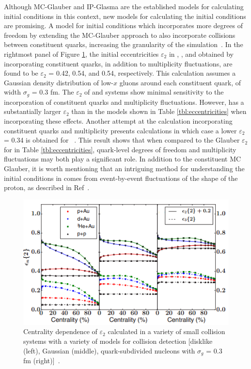 Although MC-Glauber and IP-Glasma are the established models for calculating initial conditions in this context, new models for calculating the initial conditions are promising. A model for initial conditions which incorporates more degrees of freedom by extending the MC-Glauber approach to also incorporate collisions between constituent quarks, increasing the granularity of the simulation~\cite{PhysRevC.67.064905}. In the rightmost panel of Figure \ref{fig:epsilon_2_theory}, the initial eccentricities $\varepsilon_2$ in \pau, \dau, and \hau obtained by incorporating constituent quarks, in addition to multiplicity fluctuations, are found to be $\varepsilon_2$ = 0.42, 0.54, and 0.54, respectively. This calculation assumes a Gaussian density distribution of low-$x$ gluons around each constituent quark, of width $\sigma_g$ = 0.3 fm. The $\varepsilon_2$ of \dau and \hau systems show minimal sensitivity to the incorporation of constituent quarks and multiplicity fluctuations. However, \pau has a substantially larger $\varepsilon_2$ than in the models shown in Table \ref{tbl:eccentricities} when incorporating these effects. Another attempt at the calculation incorporating constituent quarks and multiplicity presents calculations in which case a lower $\varepsilon_2$ = 0.34 is obtained for \pau ~\cite{PhysRevC.94.024919}. This result shows that when compared to the Glauber $\varepsilon_2$ for \pau in Table \ref{tbl:eccentricities}, quark-level degrees of freedom and multiplicity fluctuations may both play a significant role. In addition to the constituent MC Glauber, it is worth mentioning that an intriguing method for understanding the initial conditions in \pau comes from event-by-event fluctuations of the shape of the proton, as described in Ref~\cite{Schlichting2014313}. 

\begin{figure}[!ht]
\begin{center}
\includegraphics[width=0.6\linewidth]{figs/theoretical_epsilon_values.png}
\caption{Centrality dependence of $\varepsilon_2$ calculated in a variety of small collision systems with a variety of models for collision detection [disklike (left), Gaussian (middle), quark-subdivided nucleons with $\sigma_g$ = 0.3 fm (right)]~\cite{PhysRevC.94.024919}.}
\label{fig:epsilon_2_theory}
\end{center}
\end{figure}

